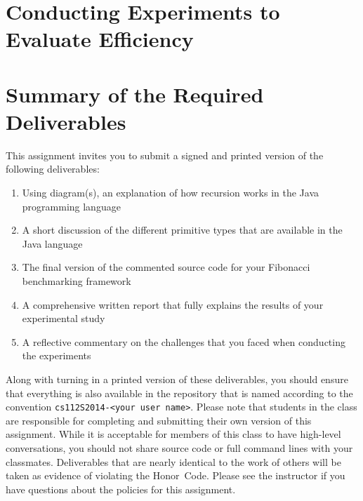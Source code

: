 \section*{Conducting Experiments to Evaluate Efficiency}

\section*{Summary of the Required Deliverables}

  This assignment invites you to submit a signed and printed version of the following deliverables: 

  \begin{enumerate} 
  \itemsep0pt
  \item Using diagram(s), an explanation of how recursion works in the Java programming language

  \item A short discussion of the different primitive types that are available in the Java language

  \item The final version of the commented source code for your Fibonacci benchmarking framework

  \item A comprehensive written report that fully explains the results of your experimental study

  \item A reflective commentary on the challenges that you faced when conducting the experiments
   
  \end{enumerate}

  Along with turning in a printed version of these deliverables, you should ensure that everything is also available in
  the repository that is named according to the convention {\tt cs112S2014-<your user name>}. Please note that students
  in the class are responsible for completing and submitting their own version of this assignment.    While it is
  acceptable for members of this class to have high-level conversations, you should not share source code or full
  command lines with your classmates.  Deliverables that are nearly identical to the work of others will be taken as
  evidence of violating the \mbox{Honor Code}.  Please see the instructor if you have questions about the policies for
  this assignment.

  
